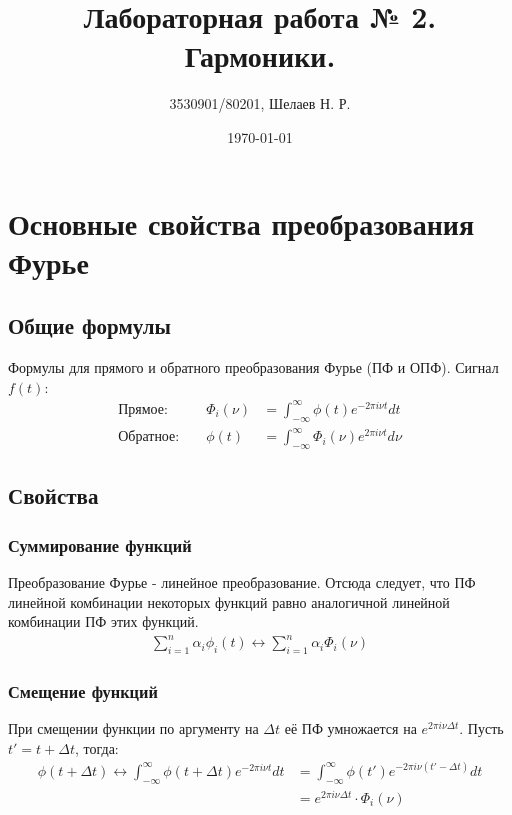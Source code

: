 \documentclass[a4paper, 12pt]{report}
\author{3530901/80201, Шелаев Н. Р.}
\title{Лабораторная работа № 2. Гармоники.}
\date{\today}
\begin{document}
	\maketitle
	\tableofcontents
	\listoffigures
	\lstlistoflistings

	\chapter{Основные свойства преобразования Фурье}
	\section{Общие формулы}
	Формулы для прямого и обратного преобразования Фурье (ПФ и ОПФ). Сигнал $f(t)$:
	\[
        		\begin{aligned}
            		\text{Прямое: } && \Phi_i(\nu) &= \int_{-\infty}^{\infty} \phi(t) e^{-2\pi i\nu t} dt \\
            		\text{Обратное: } && \phi(t) &=  \int_{-\infty}^{\infty} \Phi_i(\nu) e^{2\pi i\nu t} d\nu
        		\end{aligned}
    	\]
	\section{Свойства}
    	\subsection{Суммирование функций}
	Преобразование Фурье - линейное преобразование. Отсюда следует, что ПФ линейной комбинации некоторых функций равно аналогичной линейной комбинации ПФ этих функций.
	\[
        		\begin{aligned}
            		 \sum_{i = 1}^{n}\alpha_i\phi_i(t) \leftrightarrow \sum_{i = 1}^{n}\alpha_i\Phi_i(\nu)
        		\end{aligned}
    	\]

	\subsection{Смещение функций}
	При смещении функции по аргументу на $\Delta t$ её ПФ умножается на $e^{2\pi i \nu\Delta t}$. Пусть $t' = t + \Delta t$, тогда:
	\[
        		\begin{aligned}
            		\phi(t + \Delta t) \leftrightarrow \int_{-\infty}^{\infty} \phi(t + \Delta t) e^{-2\pi i\nu t} dt
			&= \int_{-\infty}^{\infty} \phi(t') e^{-2\pi i\nu (t' - \Delta t)} dt \\
			&= e^{2\pi i\nu\Delta t} \cdot \Phi_i(\nu)
        		\end{aligned}
    	\]
\end{document}
